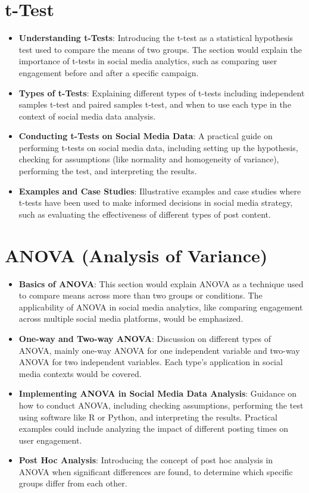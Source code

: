 \documentclass[
]{book}
\providecommand{\tightlist}{%
  \setlength{\itemsep}{0pt}\setlength{\parskip}{0pt}}
\begin{document}
\hypertarget{t-test}{%
\section*{t-Test}\label{t-test}}

\begin{itemize}
\tightlist
\item
  \textbf{Understanding t-Tests}: Introducing the t-test as a statistical hypothesis test used to compare the means of two groups. The section would explain the importance of t-tests in social media analytics, such as comparing user engagement before and after a specific campaign.
\item
  \textbf{Types of t-Tests}: Explaining different types of t-tests including independent samples t-test and paired samples t-test, and when to use each type in the context of social media data analysis.
\item
  \textbf{Conducting t-Tests on Social Media Data}: A practical guide on performing t-tests on social media data, including setting up the hypothesis, checking for assumptions (like normality and homogeneity of variance), performing the test, and interpreting the results.
\item
  \textbf{Examples and Case Studies}: Illustrative examples and case studies where t-tests have been used to make informed decisions in social media strategy, such as evaluating the effectiveness of different types of post content.
\end{itemize}

\hypertarget{anova-analysis-of-variance}{%
\section*{ANOVA (Analysis of Variance)}\label{anova-analysis-of-variance}}

\begin{itemize}
\tightlist
\item
  \textbf{Basics of ANOVA}: This section would explain ANOVA as a technique used to compare means across more than two groups or conditions. The applicability of ANOVA in social media analytics, like comparing engagement across multiple social media platforms, would be emphasized.
\item
  \textbf{One-way and Two-way ANOVA}: Discussion on different types of ANOVA, mainly one-way ANOVA for one independent variable and two-way ANOVA for two independent variables. Each type's application in social media contexts would be covered.
\item
  \textbf{Implementing ANOVA in Social Media Data Analysis}: Guidance on how to conduct ANOVA, including checking assumptions, performing the test using software like R or Python, and interpreting the results. Practical examples could include analyzing the impact of different posting times on user engagement.
\item
  \textbf{Post Hoc Analysis}: Introducing the concept of post hoc analysis in ANOVA when significant differences are found, to determine which specific groups differ from each other.
\end{itemize}
\end{document}
